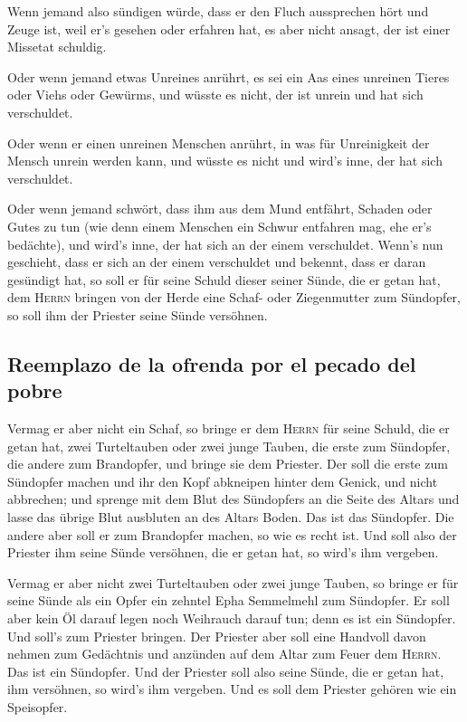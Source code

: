  Wenn jemand also sündigen würde, dass er den Fluch
aussprechen hört und Zeuge ist, weil er's gesehen oder erfahren hat, es
aber nicht ansagt, der ist einer Missetat schuldig.

 Oder wenn jemand etwas Unreines anrührt, es sei ein Aas
eines unreinen Tieres oder Viehs oder Gewürms, und wüsste es nicht, der
ist unrein und hat sich verschuldet.

 Oder wenn er einen unreinen Menschen anrührt, in was für
Unreinigkeit der Mensch unrein werden kann, und wüsste es nicht und
wird's inne, der hat sich verschuldet.

 Oder wenn jemand schwört, dass ihm aus dem Mund entfährt,
Schaden oder Gutes zu tun (wie denn einem Menschen ein Schwur entfahren
mag, ehe er's bedächte), und wird's inne, der hat sich an der einem
verschuldet.  Wenn's nun geschieht, dass er sich an der
einem verschuldet und bekennt, dass er daran gesündigt hat,
 so soll er für seine Schuld dieser seiner Sünde, die er
getan hat, dem \textsc{Herrn} bringen von der Herde eine Schaf- oder
Ziegenmutter zum Sündopfer, so soll ihm der Priester seine Sünde
versöhnen.

\hypertarget{reemplazo-de-la-ofrenda-por-el-pecado-del-pobre}{%
\subsection{Reemplazo de la ofrenda por el pecado del
pobre}\label{reemplazo-de-la-ofrenda-por-el-pecado-del-pobre}}

 Vermag er aber nicht ein Schaf, so bringe er dem
\textsc{Herrn} für seine Schuld, die er getan hat, zwei Turteltauben
oder zwei junge Tauben, die erste zum Sündopfer, die andere zum
Brandopfer,  und bringe sie dem Priester. Der soll die
erste zum Sündopfer machen und ihr den Kopf abkneipen hinter dem Genick,
und nicht abbrechen;  und sprenge mit dem Blut des
Sündopfers an die Seite des Altars und lasse das übrige Blut ausbluten
an des Altars Boden. Das ist das Sündopfer.  Die andere
aber soll er zum Brandopfer machen, so wie es recht ist. Und soll also
der Priester ihm seine Sünde versöhnen, die er getan hat, so wird's ihm
vergeben.

 Vermag er aber nicht zwei Turteltauben oder zwei junge
Tauben, so bringe er für seine Sünde als ein Opfer ein zehntel Epha
Semmelmehl zum Sündopfer. Er soll aber kein Öl darauf legen noch
Weihrauch darauf tun; denn es ist ein Sündopfer.  Und
soll's zum Priester bringen. Der Priester aber soll eine Handvoll davon
nehmen zum Gedächtnis und anzünden auf dem Altar zum Feuer dem
\textsc{Herrn}. Das ist ein Sündopfer.  Und der Priester
soll also seine Sünde, die er getan hat, ihm versöhnen, so wird's ihm
vergeben. Und es soll dem Priester gehören wie ein Speisopfer.

